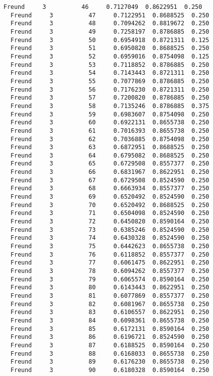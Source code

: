 \documentclass[11pt]{article}
\begin{document}
\begin{Verbatim}[commandchars=\\\{\}]
  Freund     3          46     0.7127049  0.8622951  0.250
  Freund     3          47     0.7122951  0.8688525  0.250
  Freund     3          48     0.7094262  0.8819672  0.250
  Freund     3          49     0.7258197  0.8786885  0.250
  Freund     3          50     0.6954918  0.8721311  0.125
  Freund     3          51     0.6950820  0.8688525  0.250
  Freund     3          52     0.6959016  0.8754098  0.125
  Freund     3          53     0.7118852  0.8786885  0.250
  Freund     3          54     0.7143443  0.8721311  0.250
  Freund     3          55     0.7077869  0.8786885  0.250
  Freund     3          56     0.7176230  0.8721311  0.250
  Freund     3          57     0.7200820  0.8786885  0.250
  Freund     3          58     0.7135246  0.8786885  0.375
  Freund     3          59     0.6983607  0.8754098  0.250
  Freund     3          60     0.6922131  0.8655738  0.250
  Freund     3          61     0.7016393  0.8655738  0.250
  Freund     3          62     0.7036885  0.8754098  0.250
  Freund     3          63     0.6872951  0.8688525  0.250
  Freund     3          64     0.6795082  0.8688525  0.250
  Freund     3          65     0.6729508  0.8557377  0.250
  Freund     3          66     0.6831967  0.8622951  0.250
  Freund     3          67     0.6729508  0.8524590  0.250
  Freund     3          68     0.6663934  0.8557377  0.250
  Freund     3          69     0.6520492  0.8524590  0.250
  Freund     3          70     0.6520492  0.8688525  0.250
  Freund     3          71     0.6504098  0.8524590  0.250
  Freund     3          72     0.6450820  0.8590164  0.250
  Freund     3          73     0.6385246  0.8524590  0.250
  Freund     3          74     0.6430328  0.8524590  0.250
  Freund     3          75     0.6442623  0.8655738  0.250
  Freund     3          76     0.6118852  0.8557377  0.250
  Freund     3          77     0.6061475  0.8622951  0.250
  Freund     3          78     0.6094262  0.8557377  0.250
  Freund     3          79     0.6065574  0.8590164  0.250
  Freund     3          80     0.6143443  0.8622951  0.250
  Freund     3          81     0.6077869  0.8557377  0.250
  Freund     3          82     0.6081967  0.8655738  0.250
  Freund     3          83     0.6106557  0.8622951  0.250
  Freund     3          84     0.6098361  0.8655738  0.250
  Freund     3          85     0.6172131  0.8590164  0.250
  Freund     3          86     0.6196721  0.8524590  0.250
  Freund     3          87     0.6188525  0.8590164  0.250
  Freund     3          88     0.6168033  0.8655738  0.250
  Freund     3          89     0.6176230  0.8655738  0.250
  Freund     3          90     0.6180328  0.8590164  0.250

\end{Verbatim}
\end{document}
